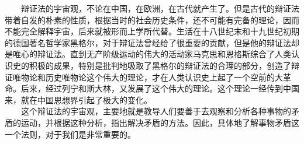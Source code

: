 \documentclass[cn,11pt,chinese]{elegantbook}
\begin{document}
　　辩证法的宇宙观，不论在中国，在欧洲，在古代就产生了。但是古代的辩证法带着自发的朴素的性质，根据当时的社会历史条件，还不可能有完备的理论，因而不能完全解释宇宙，后来就被形而上学所代替。生活在十八世纪末和十九世纪初期的德国著名哲学家黑格尔，对于辩证法曾经给了很重要的贡献，但是他的辩证法却是唯心的辩证法。直到无产阶级运动的伟大的活动家马克思和恩格斯综合了人类认识史的积极的成果，特别是批判地吸取了黑格尔的辩证法的合理的部分，创造了辩证唯物论和历史唯物论这个伟大的理论，才在人类认识史上起了一个空前的大革命。后来，经过列宁和斯大林，又发展了这个伟大的理论。这个理论一经传到中国来，就在中国思想界引起了极大的变化。\\
　　这个辩证法的宇宙观，主要地就是教导人们要善于去观察和分析各种事物的矛盾的运动，并根据这种分析，指出解决矛盾的方法。因此，具体地了解事物矛盾这一个法则，对于我们是非常重要的。\\
\end{document}
